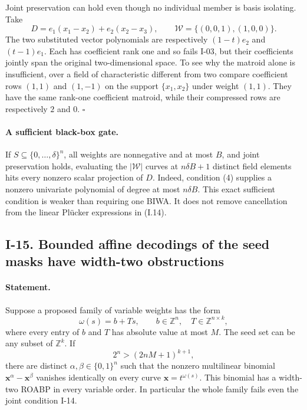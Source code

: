 \documentclass[11pt,a4paper]{article}
\theoremstyle{definition}\newtheorem{definition}{Definition}
\begin{document}
Joint preservation can hold even though no individual member is
basis isolating.  Take
\[
 D=e_1(x_1-x_2)+e_2(x_2-x_3),\qquad
 \mathcal W=\{(0,0,1),(1,0,0)\}.
\]
The two substituted vector polynomials are respectively
$(1-t)e_2$ and $(t-1)e_1$.  Each has coefficient rank one and so
fails I-03, but their coefficients jointly span the original
two-dimensional space.  To see why the matroid alone is insufficient,
over a field of characteristic different from two compare coefficient
rows $(1,1)$ and $(1,-1)$ on the support $\{x_1,x_2\}$ under weight
$(1,1)$.  They have the same rank-one coefficient matroid, while
their compressed rows are respectively $2$ and $0$.
\hfill$\square$

\paragraph{A sufficient black-box gate.}
If $S\subseteq\{0,\ldots,\delta\}^n$, all weights are nonnegative
and at most $B$, and joint preservation holds, evaluating the
$|\mathcal W|$ curves at $n\delta B+1$ distinct field elements
hits every nonzero scalar projection of $D$.  Indeed, condition
(4) supplies a nonzero univariate polynomial of degree at most
$n\delta B$.  This exact sufficient condition is weaker than
requiring one BIWA.  It does not remove cancellation from the
linear Pl\"ucker expressions in (I.14).

\subsection{I-15. Bounded affine decodings of the seed masks have width-two obstructions}
\label{I-15}

\paragraph{Statement.}
Suppose a proposed family of variable weights has the form
\[
 \omega(s)=b+Ts,\qquad
 b\in\mathbb Z^n,\quad T\in\mathbb Z^{n\times k},
\]
where every entry of $b$ and $T$ has absolute value at most $M$.
The seed set can be any subset of $\mathbb Z^k$.  If
\[
 2^n>(2nM+1)^{k+1},
\tag{I.15}\label{eq:I-affine-mask-count}
\]
there are distinct $\alpha,\beta\in\{0,1\}^n$ such that the
nonzero multilinear binomial $\mathbf x^\alpha-\mathbf x^\beta$
vanishes identically on every curve $\mathbf x=t^{\omega(s)}$.
This binomial has a width-two ROABP in every variable order.
In particular the whole family fails even the joint condition I-14.
\end{document}
